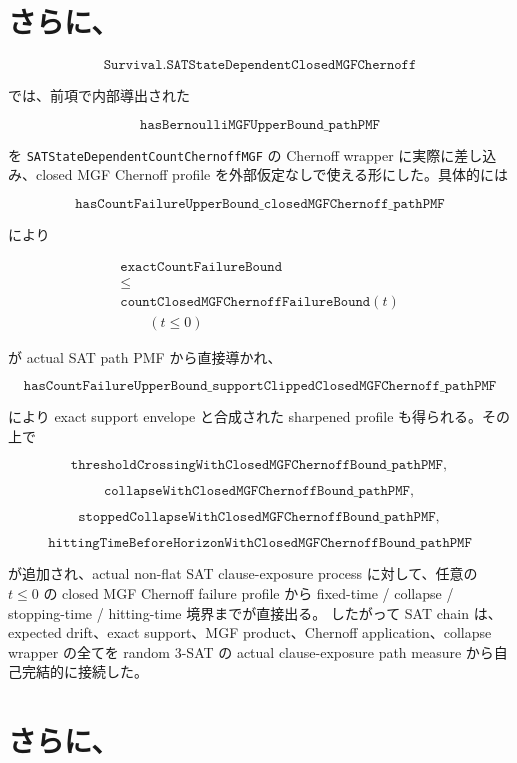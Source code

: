 \documentclass[12pt,a4paper]{article}
\begin{document}
\section{さらに、}\label{ux3055ux3089ux306b-30}

\[
\texttt{Survival.SATStateDependentClosedMGFChernoff}
\]

では、前項で内部導出された

\[
\texttt{hasBernoulliMGFUpperBound\_pathPMF}
\]

を \texttt{SATStateDependentCountChernoffMGF} の Chernoff wrapper に実際に差し込み、closed MGF Chernoff profile を外部仮定なしで使える形にした。具体的には

\[
\texttt{hasCountFailureUpperBound\_closedMGFChernoff\_pathPMF}
\]

により

\[
\begin{aligned}
\texttt{exactCountFailureBound} \\
\le \\
\texttt{countClosedMGFChernoffFailureBound}(t) \\
\qquad (t\le 0)
\end{aligned}
\]

が actual SAT path PMF から直接導かれ、

\[
\texttt{hasCountFailureUpperBound\_supportClippedClosedMGFChernoff\_pathPMF}
\]

により exact support envelope と合成された sharpened profile も得られる。その上で

\[
\texttt{thresholdCrossingWithClosedMGFChernoffBound\_pathPMF},
\]

\[
\texttt{collapseWithClosedMGFChernoffBound\_pathPMF},
\]

\[
\texttt{stoppedCollapseWithClosedMGFChernoffBound\_pathPMF},
\]

\[
\texttt{hittingTimeBeforeHorizonWithClosedMGFChernoffBound\_pathPMF}
\]

が追加され、actual non-flat SAT clause-exposure process に対して、任意の \(t\le 0\) の closed MGF Chernoff failure profile から fixed-time / collapse / stopping-time / hitting-time 境界までが直接出る。 したがって SAT chain は、expected drift、exact support、MGF product、Chernoff application、collapse wrapper の全てを random 3-SAT の actual clause-exposure path measure から自己完結的に接続した。

\section{さらに、}\label{ux3055ux3089ux306b-31}
\end{document}
